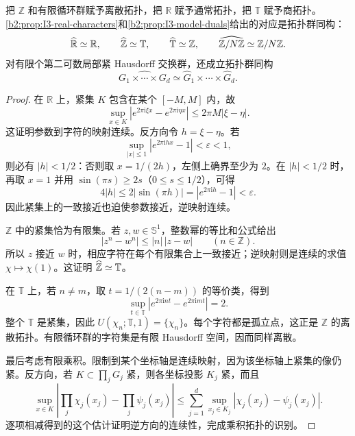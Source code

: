 \begin{proposition}[基本对偶的拓扑识别]
\label{b2:prop:I3-model-topology}
把 \(\mathbb Z\) 和有限循环群赋予离散拓扑，把 \(\mathbb R\) 赋予通常拓扑，把 \(\mathbb T\) 赋予商拓扑。\cref{b2:prop:I3-real-characters}和\cref{b2:prop:I3-model-duals}给出的对应是拓扑群同构：
\[
 \widehat{\mathbb R\kern0pt}\simeq\mathbb R,\qquad
 \widehat{\mathbb Z\kern0pt}\simeq\mathbb T,\qquad
 \widehat{\mathbb T\kern0pt}\simeq\mathbb Z,\qquad
 \widehat{\mathbb Z/N\mathbb Z\kern0pt}\simeq\mathbb Z/N\mathbb Z.
\]
对有限个第二可数局部紧 Hausdorff 交换群，还成立拓扑群同构
\[
 \widehat{G_1\times\cdots\times G_d}
 \simeq\widehat G_1\times\cdots\times\widehat G_d.
\]
\end{proposition}
\begin{proof}
在 \(\mathbb R\) 上，紧集 \(K\) 包含在某个 \([-M,M]\) 内，故
\[
 \sup_{x\in K}|e^{2\pi\mathrm i\xi x}-e^{2\pi\mathrm i\eta x}|
 \le2\pi M|\xi-\eta|.
\]
这证明参数到字符的映射连续。反方向令 \(h=\xi-\eta\)。若
\[
 \sup_{|x|\le1}|e^{2\pi\mathrm ihx}-1|<\varepsilon<1,
\]
则必有 \(|h|<1/2\)：否则取 \(x=1/(2h)\)，左侧上确界至少为 \(2\)。在 \(|h|<1/2\) 时，再取 \(x=1\) 并用 \(\sin(\pi s)\ge2s\)（\(0\le s\le1/2\)），可得
\[
 4|h|\le2|\sin(\pi h)|=|e^{2\pi\mathrm ih}-1|<\varepsilon.
\]
因此紧集上的一致接近也迫使参数接近，逆映射连续。

\(\mathbb Z\) 中的紧集恰为有限集。若 \(z,w\in\mathbb S^1\)，整数幂的等比和公式给出
\[
 |z^n-w^n|\le |n|\,|z-w|\qquad(n\in\mathbb Z).
\]
所以 \(z\) 接近 \(w\) 时，相应字符在每个有限集合上一致接近；逆映射则是连续的求值 \(\chi\mapsto\chi(1)\)。这证明 \(\widehat{\mathbb Z\kern0pt}\simeq\mathbb T\)。

在 \(\mathbb T\) 上，若 \(n\ne m\)，取 \(t=1/(2(n-m))\) 的等价类，得到
\[
 \sup_{t\in\mathbb T}|e^{2\pi\mathrm int}-e^{2\pi\mathrm imt}|=2.
\]
整个 \(\mathbb T\) 是紧集，因此 \(U(\chi_n;\mathbb T,1)=\{\chi_n\}\)。每个字符都是孤立点，这正是 \(\mathbb Z\) 的离散拓扑。有限循环群的字符集是有限 Hausdorff 空间，因而同样离散。

最后考虑有限乘积。限制到某个坐标轴是连续映射，因为该坐标轴上紧集的像仍紧。反方向，若 \(K\subset\prod_jG_j\) 紧，则各坐标投影 \(K_j\) 紧，而且
\[
 \sup_{x\in K}\left|\prod_j\chi_j(x_j)-\prod_j\psi_j(x_j)\right|
 \le\sum_{j=1}^d\sup_{x_j\in K_j}|\chi_j(x_j)-\psi_j(x_j)|.
\]
逐项相减得到的这个估计证明逆方向的连续性，完成乘积拓扑的识别。
\end{proof}

